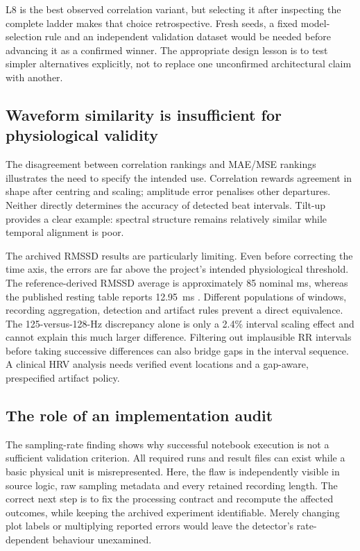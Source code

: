 \documentclass[11pt,a4paper]{article}
\begin{document}
L8 is the best observed correlation variant, but selecting it after inspecting the complete
ladder makes that choice retrospective. Fresh seeds, a fixed model-selection rule and an
independent validation dataset would be needed before advancing it as a confirmed winner.
The appropriate design lesson is to test simpler alternatives explicitly, not to replace
one unconfirmed architectural claim with another.

\subsection{Waveform similarity is insufficient for physiological validity}

The disagreement between correlation rankings and MAE/MSE rankings illustrates the need
to specify the intended use. Correlation rewards agreement in shape after centring and
scaling; amplitude error penalises other departures. Neither directly determines the
accuracy of detected beat intervals. Tilt-up provides a clear example: spectral structure
remains relatively similar while temporal alignment is poor.

The archived RMSSD results are particularly limiting. Even before correcting the time
axis, the errors are far above the project's intended physiological threshold. The
reference-derived RMSSD average is approximately 85 nominal ms, whereas the published
resting table reports 12.95~ms \citep{chowdhury2024}. Different populations of windows,
recording aggregation, detection and artifact rules prevent a direct equivalence. The
125-versus-128-Hz discrepancy alone is only a 2.4\% interval scaling effect and cannot
explain this much larger difference. Filtering out implausible RR intervals before taking
successive differences can also bridge gaps in the interval sequence. A clinical HRV
analysis needs verified event locations and a gap-aware, prespecified artifact policy.

\subsection{The role of an implementation audit}

The sampling-rate finding shows why successful notebook execution is not a sufficient
validation criterion. All required runs and result files can exist while a basic physical
unit is misrepresented. Here, the flaw is independently visible in source logic, raw
sampling metadata and every retained recording length. The correct next step is to fix
the processing contract and recompute the affected outcomes, while keeping the archived
experiment identifiable. Merely changing plot labels or multiplying reported errors would
leave the detector's rate-dependent behaviour unexamined.
\end{document}
